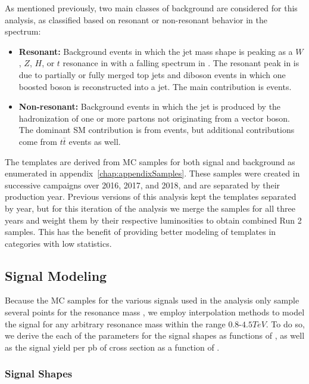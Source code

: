 As mentioned previously, two main classes of background are considered for this analysis, as classified based on resonant or non-resonant behavior in the \MJ spectrum:
\begin{itemize}
  \item \textbf{Resonant:} Background events in which the jet mass shape is peaking as a $W$, $Z$, $H$, or $t$ resonance in \MJ with a falling spectrum in \MVV.
  The resonant peak in \MJ is due to partially or fully merged top jets and diboson events in which one boosted boson is reconstructed into a jet.
  The main contribution is \WVt events.
  \item \textbf{Non-resonant:} Background events in which the jet is produced by the hadronization of one or more partons not originating from a vector boson.
  The dominant SM contribution is from \Wjets events, but additional contributions come from $t\bar{t}$ events as well.
\end{itemize}

The templates are derived from MC samples for both signal and background as enumerated in appendix~\ref{chap:appendixSamples}.
These samples were created in successive campaigns over 2016, 2017, and 2018, and are separated by their production year.
Previous versions of this analysis kept the templates separated by year, but for this iteration of the analysis we merge the samples for all three years and weight them by their respective luminosities to obtain combined Run 2 samples.
This has the benefit of providing better modeling of templates in categories with low statistics.

\subsection{Signal Modeling}
\label{sec:sig}

Because the MC samples for the various signals used in the analysis only sample several points for the resonance mass \MX, we employ interpolation methods to model the signal for any arbitrary resonance mass \MX within the range 0.8-$4.5\unit{TeV}$.
To do so, we derive the each of the parameters for the signal shapes as functions of \MX, as well as the signal yield per pb of cross section as a function of \MX.

\subsubsection{Signal Shapes}

